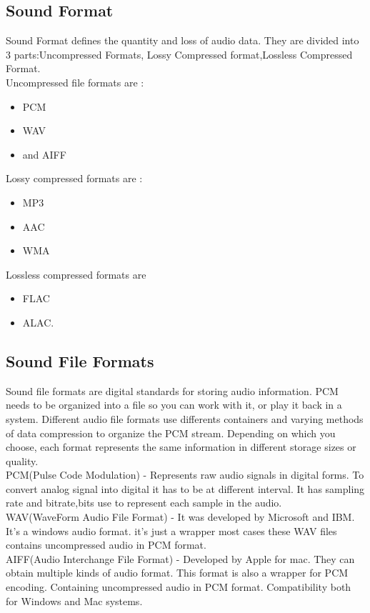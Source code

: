 \documentclass[english,12pt,oneside,a4paper]{article}
\begin{document}
\begin{center}
		\section{Sound Format}
		Sound Format defines the  quantity and loss of audio data.
		They are divided into 3 parts:Uncompressed Formats,	Lossy Compressed format,Lossless Compressed Format.
		\\
		Uncompressed file formats are :
		\begin{itemize}
		\item PCM
		\item WAV 
		\item and AIFF
		\end{itemize}
		Lossy compressed formats are : 
		\begin{itemize}
		\item MP3
		\item AAC
		\item WMA
		\end{itemize}
		Lossless compressed formats are
		\begin{itemize}
		\item FLAC
		\item ALAC.
		\end{itemize}
		
		\subsection{Sound File Formats}
		Sound file formats are digital standards for storing audio information. PCM needs to be organized into a file so you can work with it, or play it back in a system. Different audio file formats use differents containers and varying methods of data compression to organize the PCM stream. Depending on which you choose, each format represents the same information in different storage sizes or quality.\\
		PCM(Pulse Code Modulation) - Represents raw audio signals in digital forms. To convert analog signal into digital it has to be at different interval. It has sampling rate and bitrate,bits use to represent each sample in the audio.\\
		WAV(WaveForm Audio File Format) - It was developed by Microsoft and IBM. It's a windows audio format. it's just a wrapper most cases these WAV files contains uncompressed audio in PCM format.\\
		AIFF(Audio Interchange File Format) - Developed by Apple for mac.
		They can obtain multiple kinds of audio format. This format is also a wrapper for PCM encoding. Containing uncompressed audio in PCM format. Compatibility both for Windows and Mac systems.
		

\end{center}
\end{document}
